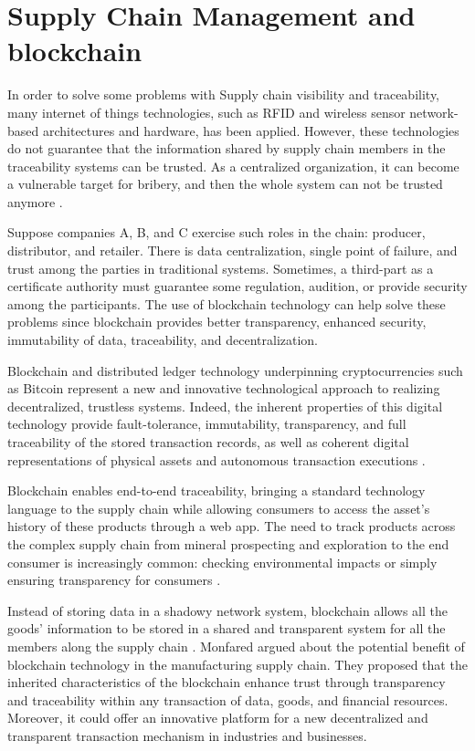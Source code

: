 \section{Supply Chain Management and blockchain}\label{sec:scmBlock}

In order to solve some problems with Supply chain visibility and traceability, many internet of things technologies, such as RFID and wireless sensor network-based architectures and hardware, has been applied. However, these technologies do not guarantee that the information shared by supply chain members in the traceability systems can be trusted. As a centralized organization, it can become a vulnerable target for bribery, and then the whole system can not be trusted anymore \cite{tian2017supply}.

Suppose companies A, B, and C exercise such roles in the chain: producer, distributor, and retailer. There is data centralization, single point of failure, and trust among the parties in traditional systems. Sometimes, a third-part as a certificate authority must guarantee some regulation, audition, or provide security among the participants. The use of blockchain technology can help solve these problems since blockchain provides better transparency, enhanced security, immutability of data, traceability, and decentralization.

Blockchain and distributed ledger technology underpinning cryptocurrencies such as Bitcoin represent a new and innovative technological approach to realizing decentralized, trustless systems. Indeed, the inherent properties of this digital technology provide fault-tolerance, immutability, transparency, and full traceability of the stored transaction records, as well as coherent digital representations of physical assets and autonomous transaction executions \cite{caro2018blockchain}.

Blockchain enables end-to-end traceability, bringing a standard technology language to the supply chain while allowing consumers to access the asset's history of these products through a web app. The need to track products across the complex supply chain from mineral prospecting and exploration to the end consumer is increasingly common: checking environmental impacts or simply ensuring transparency for consumers \cite{galvez2018future}.

Instead of storing data in a shadowy network system, blockchain allows all the goods' information to be stored in a shared and transparent system for all the members along the supply chain \cite{tian2017supply}. Monfared \cite{abeyratne2016blockchain} argued about the potential benefit of blockchain technology in the manufacturing supply chain. They proposed that the inherited characteristics of the blockchain enhance trust through transparency and traceability within any transaction of data, goods, and financial resources. Moreover, it could offer an innovative platform for a new decentralized and transparent transaction mechanism in industries and businesses.

